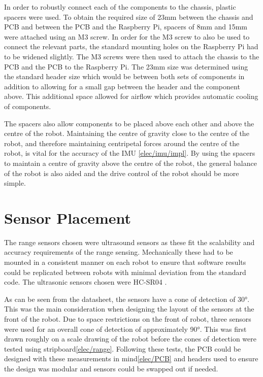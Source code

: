 In order to robustly connect each of the components to the chassis, plastic spacers were used. To obtain the required size of 23mm  between the chassis and PCB and between the PCB and the Raspberry Pi, spacers of 8mm and 15mm were attached using an M3 screw. In order for the M3 screw to also be used to connect the relevant parts, the standard mounting holes on the Raspberry Pi had to be widened slightly. The M3 screws were then used to attach the chassis to the PCB and the PCB to the Raspberry Pi. The 23mm size was determined using the standard header size which would be between both sets of components in addition to allowing for a small gap between the header and the component above. This additional space allowed for airflow which provides automatic cooling of components. 

The spacers also allow components to be placed above each other and above the centre of the robot. Maintaining the centre of gravity close to the centre of the robot, and therefore maintaining centripetal forces around the centre of the robot, is vital for the accuracy of the IMU \ref{elec/imu/impl}. By using the spacers to maintain a centre of gravity above the centre of the robot, the general balance of the robot is also aided and the drive control of the robot should be more simple.    

\section{Sensor Placement}\label{mech/sensors}
The range sensors chosen were ultrasound sensors as these fit the scalability and accuracy requirements of the range sensing. Mechanically these had to be mounted in a consistent manner on each robot to ensure that software results could be replicated between robots with minimal deviation from the standard code. The ultrasonic sensors chosen were HC-SR04 .

As can be seen from the datasheet, the sensors have a cone of detection of \ang{30}. This was the main consideration when designing the layout of the sensors at the front of the robot. Due to space restrictions on the front of robot, three sensors were used for an overall cone of detection of approximately \ang{90}. This was first drawn roughly on a scale drawing of the robot before the cones of detection were tested using stripboard\ref{elec/range}. Following these tests, the PCB could be designed with these measurements in mind\ref{elec/PCB} and headers used to ensure the design was modular and sensors could be swapped out if needed. 

